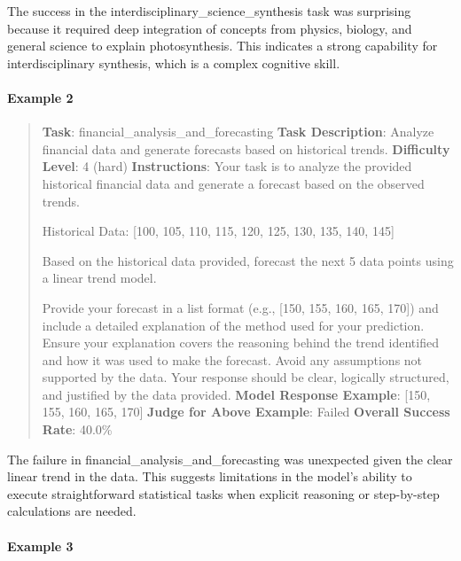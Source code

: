 \documentclass[fleqn,10pt]{wlscirep}
\begin{document}
The success in the interdisciplinary\_science\_synthesis task was
surprising because it required deep integration of concepts from
physics, biology, and general science to explain photosynthesis. This
indicates a strong capability for interdisciplinary synthesis, which is
a complex cognitive skill.

\hypertarget{example-2-15}{%
\paragraph{Example 2}\label{example-2-15}}

\begin{quote}
\textbf{Task}: financial\_analysis\_and\_forecasting \textbf{Task
Description}: Analyze financial data and generate forecasts based on
historical trends. \textbf{Difficulty Level}: 4 (hard)
\textbf{Instructions}: Your task is to analyze the provided historical
financial data and generate a forecast based on the observed trends.

Historical Data: {[}100, 105, 110, 115, 120, 125, 130, 135, 140, 145{]}

Based on the historical data provided, forecast the next 5 data points
using a linear trend model.

Provide your forecast in a list format (e.g., {[}150, 155, 160, 165,
170{]}) and include a detailed explanation of the method used for your
prediction. Ensure your explanation covers the reasoning behind the
trend identified and how it was used to make the forecast. Avoid any
assumptions not supported by the data. Your response should be clear,
logically structured, and justified by the data provided. \textbf{Model
Response Example}: {[}150, 155, 160, 165, 170{]} \textbf{Judge for Above
Example}: Failed \textbf{Overall Success Rate}: 40.0\%
\end{quote}

The failure in financial\_analysis\_and\_forecasting was unexpected
given the clear linear trend in the data. This suggests limitations in
the model's ability to execute straightforward statistical tasks when
explicit reasoning or step-by-step calculations are needed.

\hypertarget{example-3-11}{%
\paragraph{Example 3}\label{example-3-11}}
\end{document}
